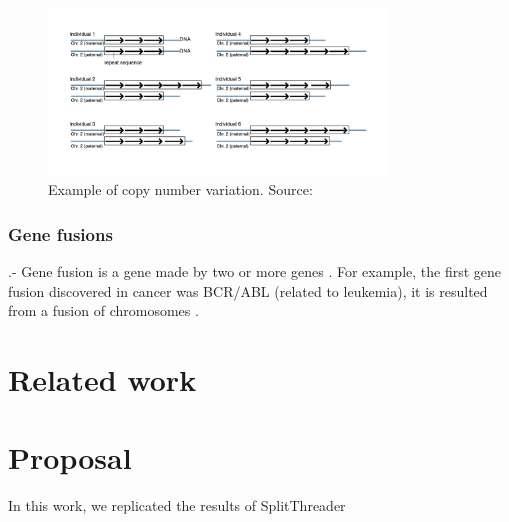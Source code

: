 \documentclass{svproc}
\begin{document}
\begin{figure}[H]
	\centering
	\includegraphics[width=0.8\textwidth]{img/splitthreader/copy_number_variation}
	\caption{Example of copy number variation. Source: \cite{cnv_nih_2021}}
	\label{fig:cnv}
\end{figure}



\subsubsection{Gene fusions}

.- Gene fusion is a gene made by two or more genes \cite{genefusion_nih_2021}. For example, the first gene
fusion discovered in cancer was BCR/ABL (related to leukemia), it is resulted from a fusion of chromosomes \cite{stam1985evidence}.

\section{Related work} 




\section{Proposal} 

In this work, we replicated the results of SplitThreader
\end{document}
